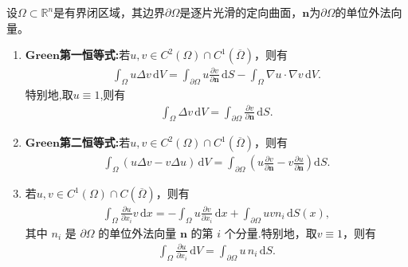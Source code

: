 \documentclass[../../main.tex]{subfiles}%
\begin{document}
\begin{theorem}[Green恒等式]\label{theorem:Green恒等式}
设$\Omega\subset\mathbb{R}^n$是有界闭区域，其边界$\partial\Omega$是逐片光滑的定向曲面，$\bm{n}$为$\partial\Omega$的单位外法向量。
\begin{enumerate}[(1)]
\item\label{theorem:Green第一恒等式} $\mathbf{Green}$\textbf{第一恒等式:}若$u,v\in C^2(\Omega)\cap C^1(\overline{\Omega})$，则有
\begin{align*}
\int_{\Omega}u\Delta v\,\mathrm{d}V=\int_{\partial\Omega}u\frac{\partial v}{\partial\bm{n}}\,\mathrm{d}S-\int_{\Omega}\nabla u\cdot\nabla v\,\mathrm{d}V.
\end{align*}
特别地,取$u\equiv 1$,则有
\begin{align*}
\int_{\Omega}\Delta v\,\mathrm{d}V=\int_{\partial\Omega}\frac{\partial v}{\partial\bm{n}}\,\mathrm{d}S.
\end{align*}

\item\label{theorem:Green第二恒等式} $\mathbf{Green}$\textbf{第二恒等式:}若$u,v\in C^2(\Omega)\cap C^1(\overline{\Omega})$，则有
\begin{align*}
\int_{\Omega}(u\Delta v-v\Delta u)\,\mathrm{d}V=\int_{\partial\Omega}\left(u\frac{\partial v}{\partial\bm{n}}-v\frac{\partial u}{\partial\bm{n}}\right)\mathrm{d}S. 
\end{align*}

\item\label{theorem:Green恒等式-3} 若$u,v\in C^1(\Omega)\cap C(\overline{\Omega})$，则有
\begin{align*}
\int_\Omega \frac{\partial u}{\partial x_i}v\,\mathrm{d}x = -\int_\Omega u \frac{\partial v}{\partial x_i}\,\mathrm{d}x + \int_{\partial\Omega} u v n_i\,\mathrm{d}S(x),
\end{align*}
其中 $n_i$ 是 $\partial\Omega$ 的单位外法向量 $\bm{n}$ 的第 $i$ 个分量.特别地，取$v\equiv 1$，则有
\begin{align*}
\int_{\Omega}\frac{\partial u}{\partial x_i}\,\mathrm{d}V=\int_{\partial\Omega}u\,n_i\,\mathrm{d}S. 
\end{align*}
\end{enumerate}
\end{theorem}
\end{document}
